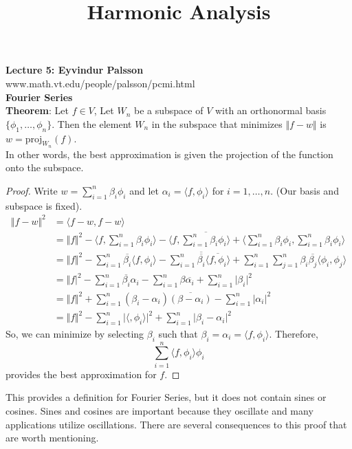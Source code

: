 \documentclass[12pt]{article}
\title{Harmonic Analysis}
\begin{document}
\noindent \textbf{Lecture 5: Eyvindur Palsson} \\
\noindent www.math.vt.edu/people/palsson/pcmi.html \\

\noindent \textbf{Fourier Series} \\

\noindent \textbf{Theorem}: Let $f \in V$, Let $W_n$ be a subspace of $V$ with an orthonormal basis $\{\phi_1, \dots, \phi_n\}$. Then the element $W_n$ in the subspace that minimizes $\Vert f - w \Vert$ is $w= \text{proj}_{W_n}(f)$. \\

\noindent In other words, the best approximation is given the projection of the function onto the subspace. 

\begin{proof}
Write $w = \sum^n_{i=1} \beta_i \phi_i$ and let $\alpha_i = \langle f, \phi_i\rangle$ for $i = 1, \dots, n$. (Our basis and subspace is fixed). 
\begin{align*}
\Vert f - w \Vert^2 &= \langle f-w, f-w \rangle \\
&= \Vert f \Vert^2 - \langle f, \sum^n_{i=1}\beta_i\phi_i\rangle - \langle f, \overline{\sum^n_{i=1}\beta_i\phi_i\rangle} + \langle \sum^n_{i=1}\beta_i\phi_i, \sum^n_{i=1}\beta_i\phi_i\rangle \\
&= \Vert f \Vert^2 - \sum^n_{i=1}\overline{\beta_i} \langle f, \phi_i \rangle - \sum^n_{i=1}\overline{\overline{\beta_i}} \overline{\langle f, \phi_i \rangle} + \sum^n_{i=1}\sum^n_{j=1} \beta_i \overline{\beta_j} \langle \phi_i, \phi_j \rangle \\
&= \Vert f \vert^2 - \sum^n_{i=1} \overline{\beta_i}\alpha_i - \sum^n_{i=1}\beta \overline{\alpha_i} + \sum^n_{i=1} \vert \beta_i \vert^2 \\
&= \Vert f \Vert^2 + \sum^n_{i=1}(\beta_i - \alpha_i)\overline{(\beta - \alpha_i)} - \sum^n_{i=1} \vert \alpha_i \vert^2 \\
&= \Vert f \Vert^2 - \sum^n_{i=1} \vert \langle, \phi_i\rangle \vert^2 + \sum^n_{i=1} \vert \beta_i - \alpha_i \vert^2
\end{align*}
So, we can minimize by selecting $\beta_i$ such that $\beta_i = \alpha_i = \langle f, \phi_i \rangle$. 
Therefore, $$\sum^n_{i=1} \langle f, \phi_i \rangle \phi_i$$
provides the best approximation for $f$. 
\end{proof}

\noindent This provides a definition for Fourier Series, but it does not contain sines or cosines. Sines and cosines are important because they oscillate and many applications utilize oscillations. There are several consequences to this proof that are worth mentioning. \\
\end{document}
